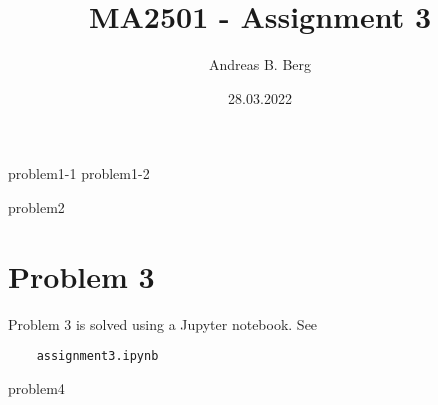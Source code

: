 \documentclass{article}
\begin{document}
\mainmatter

\title{MA2501 - Assignment 3}
\author{Andreas B. Berg}
\date{28.03.2022}
\maketitle
\thispagestyle{fancy}

{problem1-1}
\pagebreak
{problem1-2}

{problem2}

\pagebreak
\section{Problem 3}
Problem 3 is solved using a Jupyter notebook. See
\begin{verbatim}
    assignment3.ipynb
\end{verbatim}

{problem4}

\end{document}
